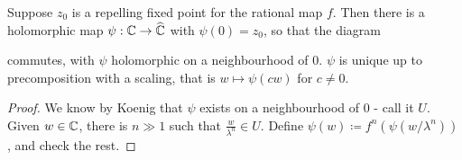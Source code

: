 \documentclass[10pt,a4paper]{article}
\begin{document}
\begin{corollary}
  Suppose $z_0$ is a repelling fixed point for the rational map $f$. Then there is a holomorphic map $\psi:\mathbb{C}\to \widehat{\mathbb{C}}$ with $\psi(0) = z_0$, so that the diagram
  \begin{center}
  \end{center}
  commutes, with $\psi$ holomorphic on a neighbourhood of $0$. $\psi$ is unique up to precomposition with a scaling, that is $w\mapsto \psi(cw)$ for $c \neq 0$.
\end{corollary}
\begin{proof}
  We know by Koenig that $\psi$ exists on a neighbourhood of $0$ - call it $U$. Given $w \in \mathbb{C}$, there is $n \gg 1$ such that $\frac{w}{\lambda^n} \in U$. Define $\psi(w) \coloneqq f^n(\psi(w/\lambda^n))$, and check the rest.
\end{proof}
\end{document}
